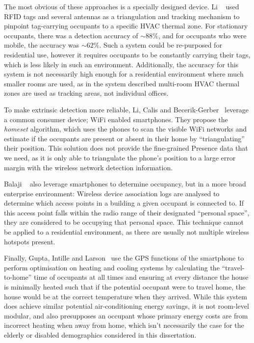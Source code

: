 \documentclass[../thesis/thesis.tex]{subfiles}
\begin{document}
The most obvious of these approaches is a specially designed device. Li \etal~\cite{li2012measuring} used RFID tags and several antennas as a triangulation and tracking mechanism to pinpoint tag-carrying occupants to a specific HVAC thermal zone. For stationary occupants, there was a detection accuracy of $\sim88\%$, and for occupants who were mobile, the accuracy was $\sim62\%$. Such a system could be re-purposed for residential use, however it requires occupants to be constantly carrying their tags, which is less likely in such an environment. Additionally, the accuracy for this system is not necessarily high enough for a residential environment where much smaller rooms are used, as in the system described multi-room HVAC thermal zones are used as tracking areas, not individual offices.

To make extrinsic detection more reliable, Li, Calis and Becerik-Gerber~\cite{kleiminger2013inferring} leverage a common consumer device; WiFi enabled smartphones. They propose the \textit{homeset} algorithm, which uses the phones to scan the visible WiFi networks and estimate if the occupants are present or absent in their home by ``triangulating'' their position. This solution does not provide the fine-grained Presence data that we need, as it is only able to triangulate the phone's position to a large error margin with the wireless network detection information.

Balaji \etal~\cite{balaji2013sentinel} also leverage smartphones to determine occupancy, but in a more broad enterprise environment: Wireless device association logs are analysed to determine which access points in a building a given occupant is connected to. If this access point falls within the radio range of their designated ``personal space'', they are considered to be occupying that personal space. This technique cannot be applied to a residential environment, as there are usually not multiple wireless hotspots present.

Finally, Gupta, Intille and Larson~\cite{gupta2009adding} use the GPS functions of the smartphone to perform optimisation on heating and cooling systems by calculating the ``travel-to-home'' time of occupants at all times and ensuring at every distance the house is minimally heated such that if the potential occupant were to travel home, the house would be at the correct temperature when they arrived. While this system does achieve similar potential air-conditioning energy savings, it is not room-level modular, and also presupposes an occupant whose primary energy costs are from incorrect heating when away from home, which isn't necessarily the case for the elderly or disabled demographics considered in this dissertation.
\end{document}
